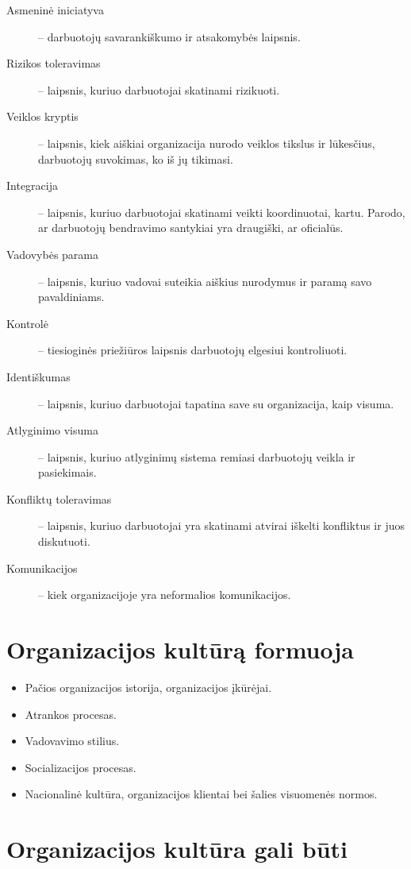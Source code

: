 \begin{description}
  \item[Asmeninė iniciatyva] – darbuotojų savarankiškumo ir atsakomybės
    laipsnis.
  \item[Rizikos toleravimas] – laipsnis, kuriuo darbuotojai skatinami
    rizikuoti.
  \item[Veiklos kryptis] – laipsnis, kiek aiškiai organizacija nurodo
    veiklos tikslus ir lūkesčius, darbuotojų suvokimas, ko iš jų tikimasi.
  \item[Integracija] – laipsnis, kuriuo darbuotojai skatinami veikti
    koordinuotai, kartu. Parodo, ar darbuotojų bendravimo santykiai
    yra draugiški, ar oficialūs.
  \item[Vadovybės parama] – laipsnis, kuriuo vadovai suteikia aiškius
    nurodymus ir paramą savo pavaldiniams.
  \item[Kontrolė] – tiesioginės priežiūros laipsnis darbuotojų elgesiui
    kontroliuoti.
  \item[Identiškumas] – laipsnis, kuriuo darbuotojai tapatina save su
    organizacija, kaip visuma.
  \item[Atlyginimo visuma] – laipsnis, kuriuo atlyginimų sistema remiasi
    darbuotojų veikla ir pasiekimais.
  \item[Konfliktų toleravimas] – laipsnis, kuriuo darbuotojai yra skatinami
    atvirai iškelti konfliktus ir juos diskutuoti.
  \item[Komunikacijos] – kiek organizacijoje yra neformalios komunikacijos.
\end{description}

\section{Organizacijos kultūrą formuoja}

\begin{itemize}
  \item Pačios organizacijos istorija, organizacijos įkūrėjai.
  \item Atrankos procesas.
  \item Vadovavimo stilius.
  \item Socializacijos procesas.
  \item Nacionalinė kultūra, organizacijos klientai bei šalies visuomenės
    normos.
\end{itemize}

\section{Organizacijos kultūra gali būti}

